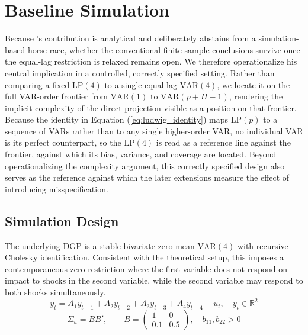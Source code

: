 
\section{Baseline Simulation}
Because \textcite{ludwig2026local}'s contribution is analytical and deliberately abstains 
from a simulation-based horse race, whether the conventional finite-sample conclusions 
survive once the equal-lag restriction is relaxed remains open. We therefore operationalize 
his central implication in a controlled, correctly specified setting. Rather than comparing a 
fixed $\text{LP}(4)$ to a single equal-lag $\text{VAR}(4)$, we locate it on the full VAR-order 
frontier from $\text{VAR}(1)$ to $\text{VAR}(p+H-1)$, rendering the implicit complexity of the 
direct projection visible as a position on that frontier. Because the identity in Equation 
(\ref{eq:ludwig_identity}) maps $\text{LP}(p)$ to a sequence of VARs rather than to any single 
higher-order VAR, no individual VAR is its perfect counterpart, so the $\text{LP}(4)$ is read 
as a reference line against the frontier, against which its bias, variance, and coverage are 
located. Beyond operationalizing the complexity argument, this correctly specified design 
also serves as the reference against which the later extensions measure the effect of 
introducing misspecification.

\subsection{Simulation Design}
The underlying DGP is a stable bivariate zero-mean $\text{VAR}(4)$ with recursive Cholesky 
identification. Consistent with the theoretical setup, this imposes a contemporaneous zero 
restriction where the first variable does not respond on impact to shocks in the second 
variable, while the second variable may respond to both shocks simultaneously.
%
\begin{equation}
    y_t = A_1 y_{t-1} + A_2 y_{t-2} + A_3 y_{t-3} + A_4 y_{t-4} + u_t, 
    \quad y_t \in \mathbb{R}^2
\end{equation}
%
\begin{equation}
    \Sigma_u = BB', \qquad 
    B = \begin{pmatrix} 1 & 0 \\ 0.1 & 0.5 \end{pmatrix}, 
    \quad b_{11}, b_{22} > 0
\end{equation}

